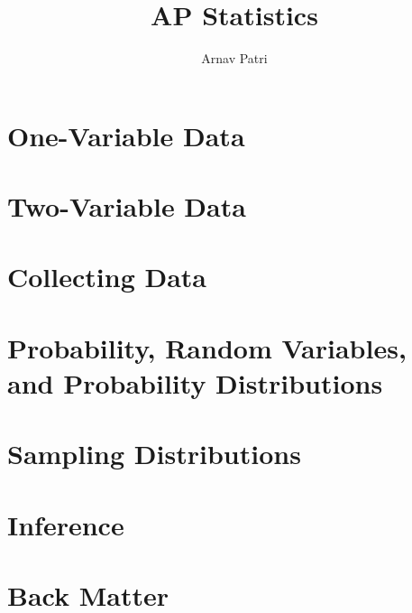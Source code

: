 \documentclass[12pt, A4]{report}
\title{AP Statistics}
\author{Arnav Patri}
\begin{document}
	\maketitle
	\tableofcontents
	\part{One-Variable Data}
		
	\part{Two-Variable Data}
		
	\part{Collecting Data}
		
	\part{Probability, Random Variables, and Probability Distributions}
		
	\part{Sampling Distributions}
		
	\part{Inference}
		
	\part{Back Matter}
		\printindex
\end{document}
